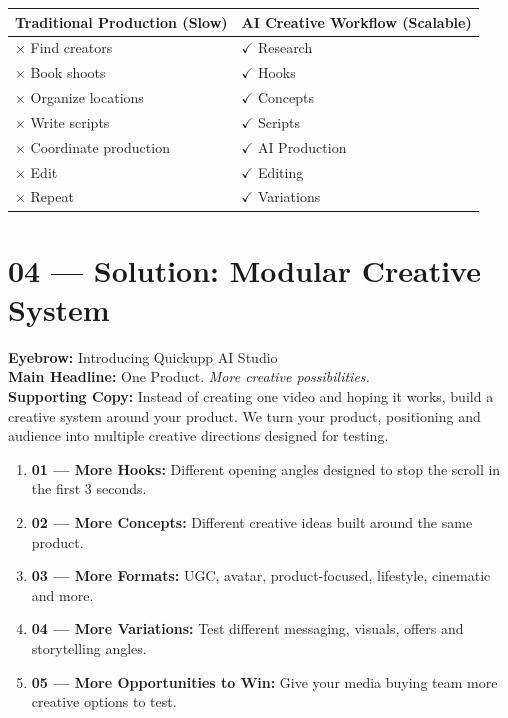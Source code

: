\documentclass[11pt,a4paper]{article}
\begin{document}
\begin{table}[h!]
\centering
\begin{tabular}{p{} | p{}}
\toprule
\textbf{Traditional Production (Slow)} & \textbf{AI Creative Workflow (Scalable)} \\
\midrule
$\times$ Find creators & $\checkmark$ Research \\
$\times$ Book shoots & $\checkmark$ Hooks \\
$\times$ Organize locations & $\checkmark$ Concepts \\
$\times$ Write scripts & $\checkmark$ Scripts \\
$\times$ Coordinate production & $\checkmark$ AI Production \\
$\times$ Edit & $\checkmark$ Editing \\
$\times$ Repeat & $\checkmark$ Variations \\
\bottomrule
\end{tabular}
\end{table}

\section{04 --- Solution: Modular Creative System}
\textbf{Eyebrow:} Introducing Quickupp AI Studio \\
\textbf{Main Headline:} One Product. \textit{More creative possibilities.}\\
\textbf{Supporting Copy:} Instead of creating one video and hoping it works, build a creative system around your product. We turn your product, positioning and audience into multiple creative directions designed for testing.

\begin{enumerate}[noitemsep]
    \item \textbf{01 — More Hooks:} Different opening angles designed to stop the scroll in the first 3 seconds.
    \item \textbf{02 — More Concepts:} Different creative ideas built around the same product.
    \item \textbf{03 — More Formats:} UGC, avatar, product-focused, lifestyle, cinematic and more.
    \item \textbf{04 — More Variations:} Test different messaging, visuals, offers and storytelling angles.
    \item \textbf{05 — More Opportunities to Win:} Give your media buying team more creative options to test.
\end{enumerate}
\end{document}
